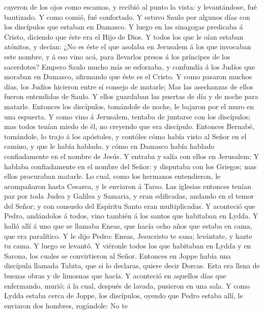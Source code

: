 cayeron de los ojos como escamas, y recibió al punto la vista: y
levantándose, fué bautizado.  Y como comió, fué confortado.
Y estuvo Saulo por algunos días con los discípulos que estaban en
Damasco.  Y luego en las sinagogas predicaba á Cristo,
diciendo que éste era el Hijo de Dios.  Y todos los que le
oían estaban atónitos, y decían: ¿No es éste el que asolaba en Jerusalem
á los que invocaban este nombre, y á eso vino acá, para llevarlos presos
á los príncipes de los sacerdotes?  Empero Saulo mucho más
se esforzaba, y confundía á los Judíos que moraban en Damasco, afirmando
que éste es el Cristo.  Y como pasaron muchos días, los
Judíos hicieron entre sí consejo de matarle;  Mas las
asechanzas de ellos fueron entendidas de Saulo. Y ellos guardaban las
puertas de día y de noche para matarle.  Entonces los
discípulos, tomándole de noche, le bajaron por el muro en una espuerta.
 Y como vino á Jerusalem, tentaba de juntarse con los
discípulos; mas todos tenían miedo de él, no creyendo que era discípulo.
 Entonces Bernabé, tomándole, lo trajo á los apóstoles, y
contóles cómo había visto al Señor en el camino, y que le había hablado,
y cómo en Damasco había hablado confiadamente en el nombre de Jesús.
 Y entraba y salía con ellos en Jerusalem;  Y
hablaba confiadamente en el nombre del Señor: y disputaba con los
Griegos; mas ellos procuraban matarle.  Lo cual, como los
hermanos entendieron, le acompañaron hasta Cesarea, y le enviaron á
Tarso.  Las iglesias entonces tenían paz por toda Judea y
Galilea y Samaria, y eran edificadas, andando en el temor del Señor; y
con consuelo del Espíritu Santo eran multiplicadas.  Y
aconteció que Pedro, andándolos á todos, vino también á los santos que
habitaban en Lydda.  Y halló allí á uno que se llamaba
Eneas, que hacía ocho años que estaba en cama, que era paralítico.
 Y le dijo Pedro: Eneas, Jesucristo te sana; levántate, y
hazte tu cama. Y luego se levantó.  Y viéronle todos los
que habitaban en Lydda y en Sarona, los cuales se convirtieron al Señor.
 Entonces en Joppe había una discípula llamada Tabita, que
si lo declaras, quiere decir Dorcas. Esta era llena de buenas obras y de
limosnas que hacía.  Y aconteció en aquellos días que
enfermando, murió; á la cual, después de lavada, pusieron en una sala.
 Y como Lydda estaba cerca de Joppe, los discípulos, oyendo
que Pedro estaba allí, le enviaron dos hombres, rogándole: No te
